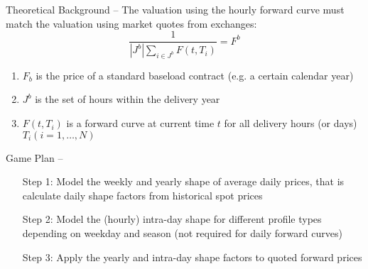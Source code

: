 \documentclass{beamer}
\begin{document}
\begin{frame}{Theoretical Background -- \cite{BurgerGraeberSchindlmayr-2014}}
    The valuation using the hourly forward curve must match the valuation using market quotes from exchanges:
    \[
        \frac{1}{|J^b| \sum_{i \in J^b} F(t, T_i)} = F^b
    \]
    \begin{enumerate}[label=--, itemsep=0.1cm]
        \item $F_b$ is the price of a standard baseload contract (e.g. a certain calendar year)

        \item $J^b$ is the set of hours within the delivery year

        \item $F(t, T_i)$ is a forward curve at current time $t$ for all delivery hours (or days) $T_i (i = 1, \ldots, N)$
    \end{enumerate}
\end{frame}


\begin{frame}{Game Plan -- \cite{BurgerGraeberSchindlmayr-2014}}
    \begin{enumerate}
        \item[Step 1:] Model the weekly and yearly shape of average daily prices, that is calculate daily shape factors from historical spot prices

        \item[Step 2:] Model the (hourly) intra-day shape for different profile types depending on weekday and season (not required for daily forward curves)

        \item[Step 3:] Apply the yearly and intra-day shape factors to quoted forward prices
    \end{enumerate}
\end{frame}
\end{document}
